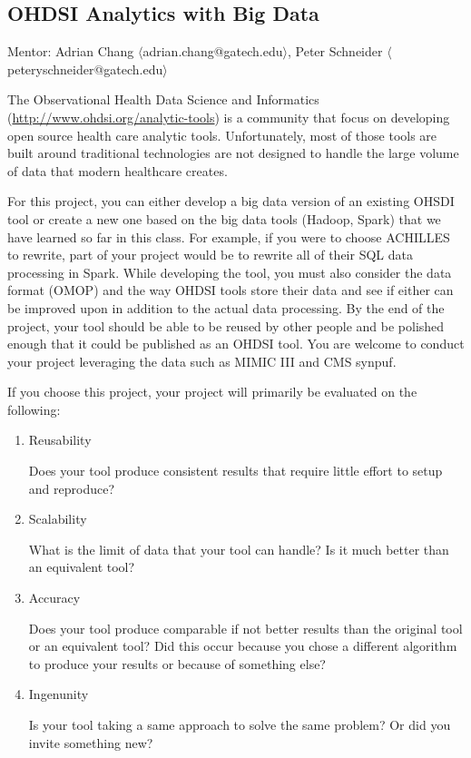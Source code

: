 \documentclass[journal]{IEEEtran}
\begin{document}


\subsection{OHDSI Analytics with Big Data}
Mentor: Adrian Chang $\langle$adrian.chang@gatech.edu$\rangle$, Peter Schneider $\langle$peteryschneider@gatech.edu$\rangle$

The Observational Health Data Science and Informatics (\href{OHDSI}{http://www.ohdsi.org/analytic-tools}) is a community that focus on developing open source health care analytic tools. Unfortunately, most of those tools are built around traditional technologies are not designed to handle the large volume of data that modern healthcare creates. 

For this project, you can either develop a big data version of an existing OHSDI tool or create a new one based on the big data tools (Hadoop, Spark) that we have learned so far in this class. For example, if you were to choose ACHILLES to rewrite, part of your project would be to rewrite all of their SQL data processing in Spark. While developing the tool, you must also consider the data format (OMOP) and the way OHDSI tools store their data and see if either can be improved upon in addition to the actual data processing. By the end of the project, your tool should be able to be reused by other people and be polished enough that it could be published as an OHDSI tool. You are welcome to conduct your project leveraging the data such as MIMIC III and CMS synpuf.

If you choose this project, your project will primarily be evaluated on the following:

\begin{enumerate}
	\item 
    Reusability
    
    Does your tool produce consistent results that require little effort to setup and reproduce?
    \item
    Scalability
    
  	What is the limit of data that your tool can handle? Is it much better than an equivalent tool?
    \item
    Accuracy
    
    Does your tool produce comparable if not better results than the original tool or an equivalent tool?
    Did this occur because you chose a different algorithm to produce your results or because of something 
    else?
    
    \item 
    Ingenunity
    
    Is your tool taking a same approach to solve the same problem? Or did you invite something new?
\end{enumerate}
\end{document}
